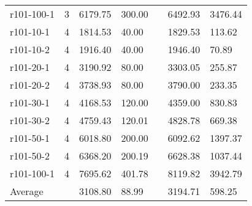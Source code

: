 \documentclass[final,5p,times,twocolumn]{elsarticle}
\begin{document}
{{{{{{{{{\begin{table}[htbp]
\begin{tabular}{l l l l l l l}
r101-100-1&3&6179.75&300.00&&6492.93&3476.44\\
r101-10-1&4&1814.53&40.00&&1829.53&113.62\\
r101-10-2&4&1916.40&40.00&&1946.40&70.89\\
r101-20-1&4&3190.92&80.00&&3303.05&255.87\\
r101-20-2&4&3738.93&80.00&&3790.00&233.35\\
r101-30-1&4&4168.53&120.00&&4359.00&830.83\\
r101-30-2&4&4759.43&120.01&&4828.78&669.38\\
r101-50-1&4&6018.80&200.00&&6092.62&1397.37\\
r101-50-2&4&6368.20&200.19&&6628.38&1037.44\\
r101-100-1&4&7695.62&401.78&&8119.82&3942.79\\
\hline
Average&&3108.80&88.99&&3194.71&598.25\\
\hline
\end{tabular}
\label{tab:pt200_20}
\end{table}

}}}}}}}}}
\end{document}
